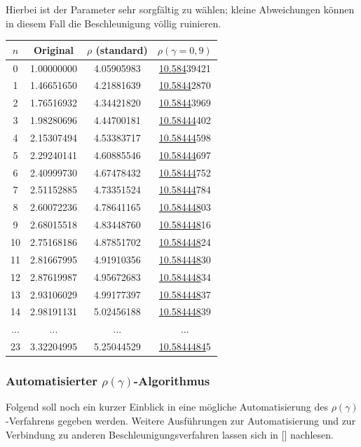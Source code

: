 \documentclass[a4paper,12pt]{article}
\numberwithin{equation}{section}
\theoremstyle{remark}
\begin{document}
Hierbei ist der Parameter sehr sorgfältig zu wählen; kleine Abweichungen können in diesem Fall die Beschleunigung völlig ruinieren.\\
\begin{center}
\begin{tabular}{c|c|c|c}
$n$ & Original & $\rho$ (standard)& $\rho(\gamma=0,9)$ \\ \hline
0 & 1.00000000 & 4.05905983 & \underline{10.584}39421 \\ 
1 & 1.46651650 & 4.21881639 & \underline{10.5844}2870 \\ 
2 & 1.76516932 & 4.34421820 & \underline{10.5844}3969 \\ 
3 & 1.98280696 & 4.44700181 & \underline{10.58444}402 \\ 
4 & 2.15307494 & 4.53383717 & \underline{10.58444}598 \\ 
5 & 2.29240141 & 4.60885546 & \underline{10.58444}697 \\ 
6 & 2.40999730 & 4.67478432 & \underline{10.58444}752 \\ 
7 & 2.51152885 & 4.73351524 & \underline{10.58444}784 \\ 
8 & 2.60072236 & 4.78641165 & \underline{10.584448}03 \\ 
9 & 2.68015518 & 4.83448760 & \underline{10.584448}16 \\ 
10 & 2.75168186 & 4.87851702 & \underline{10.584448}24 \\ 
11 & 2.81667995 & 4.91910356 & \underline{10.584448}30\\ 
12 & 2.87619987 & 4.95672683 & \underline{10.584448}34 \\ 
13 & 2.93106029 & 4.99177397 & \underline{10.584448}37 \\ 
14 & 2.98191131 & 5.02456188 & \underline{10.584448}39 \\ 
... & ... & ... & ... \\
23 & 3.32204995 & 5.25044529 & \underline{10.5844484}5
\end{tabular}
\end{center}
\subsubsection{Automatisierter $\rho(\gamma)$-Algorithmus}
Folgend soll noch ein kurzer Einblick in eine mögliche Automatisierung des $\rho(\gamma)$-Verfahrens gegeben werden. Weitere Ausführungen zur Automatisierung und zur Verbindung zu anderen Beschleunigungsverfahren lassen sich in [\cite[378]{sidi2003practical}] nachlesen.
\end{document}
